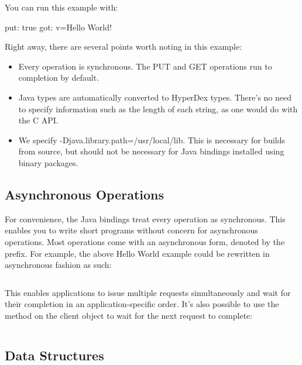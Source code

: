 \inputminted{java}{\topdir/java/client/HelloWorld.java}

You can run this example with:

\begin{consolecode}
put: true
got: {v=Hello World!}
\end{consolecode}

Right away, there are several points worth noting in this example:

\begin{itemize}
\item Every operation is synchronous.  The PUT and GET operations run to
completion by default.

\item Java types are automatically converted to HyperDex types.  There's no need
to specify information such as the length of each string, as one would do with
the C API.

\item We specify -Djava.library.path=/usr/local/lib.  This is necessary for
builds from source, but should not be necessary for Java bindings installed
using binary packages.
\end{itemize}

\subsection{Asynchronous Operations}
\label{sec:api:java:async-ops}

For convenience, the Java bindings treat every operation as synchronous.  This
enables you to write short programs without concern for asynchronous operations.
Most operations come with an asynchronous form, denoted by the 
prefix.  For example, the above Hello World example could be rewritten in
asynchronous fashion as such:

\inputminted{java}{\topdir/java/client/HelloWorldAsyncWait.java}

This enables applications to issue multiple requests simultaneously and wait for
their completion in an application-specific order.  It's also possible to use
the  method on the client object to wait for the next request to
complete:

\inputminted{java}{\topdir/java/client/HelloWorldAsyncLoop.java}

\subsection{Data Structures}
\label{sec:api:java:data-structures}

